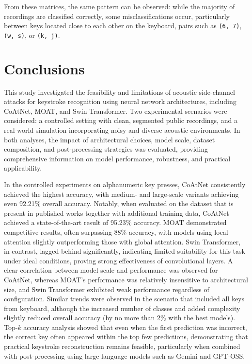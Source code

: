\documentclass[a4paper,11pt,twoside]{report}
\theoremstyle{definition}
\begin{document}
From these matrices, the same pattern can be observed: while the majority of recordings are classified correctly, some misclassifications occur, particularly between keys located close to each other on the keyboard, pairs such as \texttt{(6, 7)}, \texttt{(w, s)}, or \texttt{(k, j)}.


\chapter{Conclusions}

This study investigated the feasibility and limitations of acoustic side-channel attacks for keystroke recognition using neural network architectures, including CoAtNet, MOAT, and Swin Transformer. Two experimental scenarios were considered: a controlled setting with clean, segmented public recordings, and a real-world simulation incorporating noisy and diverse acoustic environments. In both analyses, the impact of architectural choices, model scale, dataset composition, and post-processing strategies was evaluated, providing comprehensive information on model performance, robustness, and practical applicability.

In the controlled experiments on alphanumeric key presses, CoAtNet consistently achieved the highest accuracy, with medium- and large-scale variants achieving even 92.21\% overall accuracy. Notably, when evaluated on the dataset that is present in published works together with additional training data, CoAtNet achieved a state-of-the-art result of 95.23\% accuracy. MOAT demonstrated competitive results, often surpassing 88\% accuracy, with models using local attention slightly outperforming those with global attention. Swin Transformer, in contrast, lagged behind significantly, indicating limited suitability for this task under ideal conditions, proving strong effectiveness of convolutional layers. A clear correlation between model scale and performance was observed for CoAtNet, whereas MOAT’s performance was relatively insensitive to architectural size, and Swin Transformer exhibited weak performance regardless of configuration. Similar trends were observed in the scenario that included all keys from keyboard, although the increased number of classes and added complexity slightly reduced overall accuracy (by no more than 2\% with the best models). Top-$k$ accuracy analysis showed that even when the first prediction was incorrect, the correct key often appeared within the top few predictions, demonstrating that practical keystroke reconstruction remains feasible, particularly when combined with post-processing using large language models such as Gemini and GPT-OSS.
\end{document}
